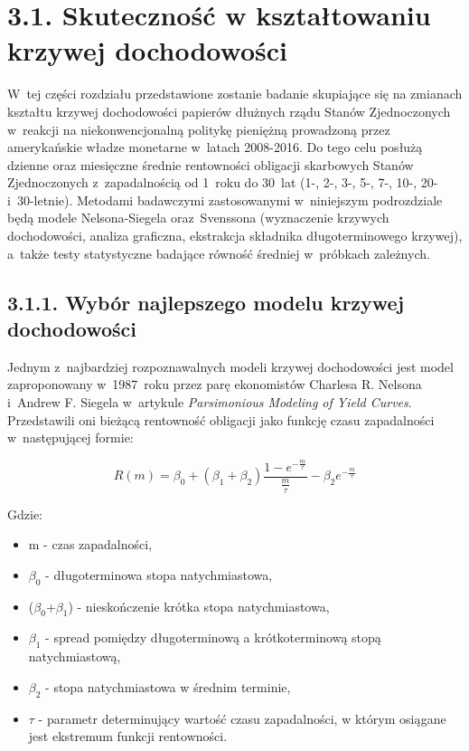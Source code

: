 \hypertarget{podrz31}{}
\section*{\large{3.1. Skuteczność w kształtowaniu krzywej dochodowości}}

W~tej części rozdziału przedstawione zostanie badanie skupiające się na zmianach kształtu krzywej dochodowości papierów dłużnych rządu Stanów Zjednoczonych w~reakcji na niekonwencjonalną politykę pieniężną prowadzoną przez amerykańskie władze monetarne w~latach 2008-2016. Do tego celu posłużą dzienne oraz miesięczne średnie rentowności obligacji skarbowych Stanów Zjednoczonych z~zapadalnością od 1~roku do 30~lat (1-, 2-, 3-, 5-, 7-, 10-, 20- i~30-letnie). Metodami badawczymi zastosowanymi w~niniejszym podrozdziale będą modele Nelsona-Siegela oraz~Svenssona (wyznaczenie krzywych dochodowości, analiza graficzna, ekstrakcja składnika długoterminowego krzywej), a~także testy statystyczne badające równość średniej w~próbkach zależnych.

\subsection*{\normalsize{3.1.1. Wybór najlepszego modelu krzywej dochodowości}}
\vspace{0.4cm}

Jednym z~najbardziej rozpoznawalnych modeli krzywej dochodowości jest model zaproponowany w~1987~roku przez parę ekonomistów Charlesa R. Nelsona i~Andrew F. Siegela w~artykule \textit{Parsimonious Modeling of Yield Curves}\cite{nelson01}. Przedstawili oni bieżącą rentowność obligacji jako funkcję czasu zapadalności w~następującej formie:

\vspace{-0.3cm}
\begin{equation}
R(m)=\beta_0+(\beta_1 + \beta_2) \frac{1-e^{-\frac{m}{\tau}}}{\frac{m}{\tau}} - \beta_2 e^{-\frac{m}{\tau}}
\end{equation}
\vspace{-1.1cm}

\noindent Gdzie:
\vspace{-0.3cm}
\begin{itemize}
\setlength\itemsep{0.05cm}
\item m - czas zapadalności,
\item $\beta_0$ - długoterminowa stopa natychmiastowa,
\item ($\beta_0$+$\beta_1$)  - nieskończenie krótka stopa natychmiastowa,
\item $\beta_1$ - spread pomiędzy długoterminową a krótkoterminową stopą natychmiastową,
\item  $\beta_2$ - stopa natychmiastowa w średnim terminie,
\item $\tau$ - parametr determinujący wartość czasu zapadalności, w którym osiągane jest ekstremum funkcji rentowności.
\end{itemize}


